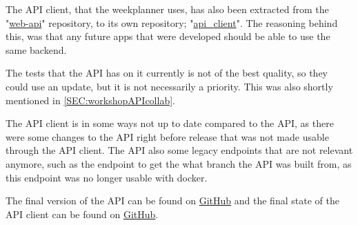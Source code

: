 The API client, that the weekplanner uses, has also been extracted from the "\href{https://github.com/aau-giraf/web-api/tree/2019S4R1}{web-api}" repository, to its own repository; "\href{https://github.com/aau-giraf/api_client/tree/2019S4R1}{api\_client}".
The reasoning behind this, was that any future apps that were developed should be able to use the same backend.

The tests that the API has on it currently is not of the best quality, so they could use an update, but it is not necessarily a priority.
This was also shortly mentioned in \autoref{SEC:workshopAPIcollab}.

The API client is in some ways not up to date compared to the API, as there were some changes to the API right before release that was not made usable through the API client.
The API also some legacy endpoints that are not relevant anymore, such as the endpoint to get the what branch the API was built from, as this endpoint was no longer usable with docker.


The final version of the API can be found on \href{https://github.com/aau-giraf/web-api/tree/2019S4R1}{GitHub} and the final state of the API client can be found on \href{https://github.com/aau-giraf/api_client/tree/2019S4R1}{GitHub}.


